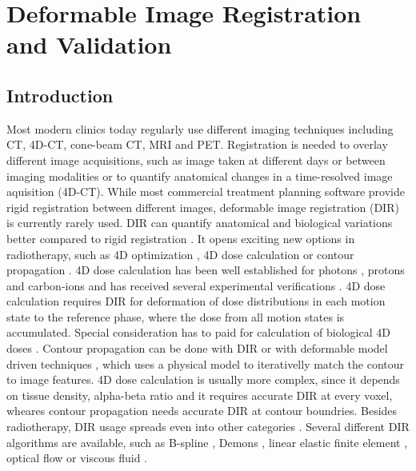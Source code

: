 \documentclass[type=dr, dr=rernat, accentcolor=tud7b,colorbacktitle, bigchapter, openright, twoside, 12pt ]{tudthesis}
\begin{document}
\chapter{Deformable Image Registration and Validation}
\label{chapter:vmm}
\minitoc

\section{Introduction}


Most modern clinics today regularly use different imaging techniques including CT, 4D-CT, cone-beam CT, MRI and PET. Registration is needed to overlay different image acquisitions, such as image taken at different days or between imaging modalities or to quantify anatomical changes in a time-resolved image aquisition (4D-CT). While most commercial treatment planning software provide rigid registration between different images, deformable image registration (DIR) is currently rarely used. 
DIR can quantify anatomical and biological variations better compared to rigid registration \cite{Sarrut2006}. It opens exciting new options in radiotherapy, such as 4D optimization \cite{Trofimov2005}, 
4D dose calculation \cite{Flampouri2006} or contour propagation \cite{Lu2006b}. 4D dose calculation has been well established for photons \cite{Ong2016}, protons \cite{Paganetti2005} and carbon-ions \cite{Gemmel2011} and has received
several experimental verifications \cite{Vinogradskiy2009, Perrin2016, Bert2012a}. 4D dose calculation requires DIR for deformation of dose distributions in each motion state
to the reference phase, where the dose from all motion states is accumulated. Special consideration has to paid for calculation of biological 4D doses \cite{Gemmel2011}. Contour propagation can be done with DIR \cite{Lu2006a, Rietzel2005a} or
with deformable model driven techniques \cite{McInerney1996, Montagnat2005}, which uses a physical model to iterativelly match the contour to image features. 4D dose calculation is usually more complex, since it depends on tissue density,
alpha-beta ratio and it requires accurate DIR at every voxel, wheares contour propagation needs accurate DIR at contour boundries.
Besides radiotherapy, DIR usage spreads even into other categories \cite{Cleary2010, Herrell2012, Nithiananthan2011, Naini2010}.
Several different DIR algorithms are available, such as B-spline \cite{Rueckert1999}, Demons \cite{Thirion1998}, linear elastic finite element \cite{Venugopal2005}, optical flow \cite{Zhong2007} or viscous fluid \cite{Christensen1996}.
	
\end{document}
